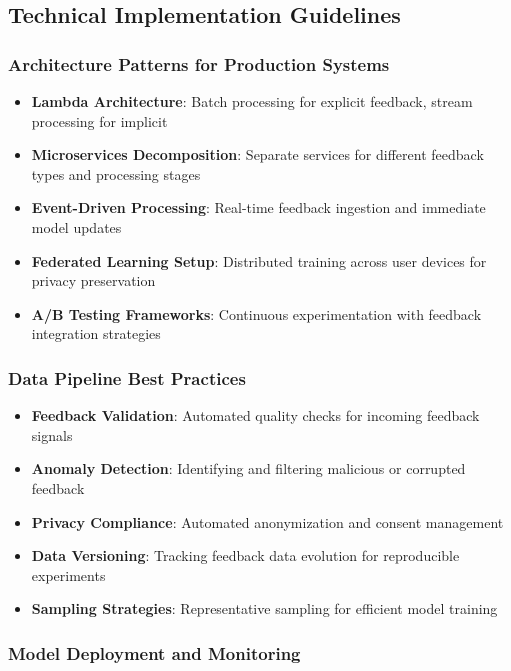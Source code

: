 \subsection{Technical Implementation Guidelines}

\subsubsection{Architecture Patterns for Production Systems}

\begin{itemize}
    \item \textbf{Lambda Architecture}: Batch processing for explicit feedback, stream processing for implicit
    \item \textbf{Microservices Decomposition}: Separate services for different feedback types and processing stages
    \item \textbf{Event-Driven Processing}: Real-time feedback ingestion and immediate model updates
    \item \textbf{Federated Learning Setup}: Distributed training across user devices for privacy preservation
    \item \textbf{A/B Testing Frameworks}: Continuous experimentation with feedback integration strategies
\end{itemize}

\subsubsection{Data Pipeline Best Practices}

\begin{itemize}
    \item \textbf{Feedback Validation}: Automated quality checks for incoming feedback signals
    \item \textbf{Anomaly Detection}: Identifying and filtering malicious or corrupted feedback
    \item \textbf{Privacy Compliance}: Automated anonymization and consent management
    \item \textbf{Data Versioning}: Tracking feedback data evolution for reproducible experiments
    \item \textbf{Sampling Strategies}: Representative sampling for efficient model training
\end{itemize}

\subsubsection{Model Deployment and Monitoring}


